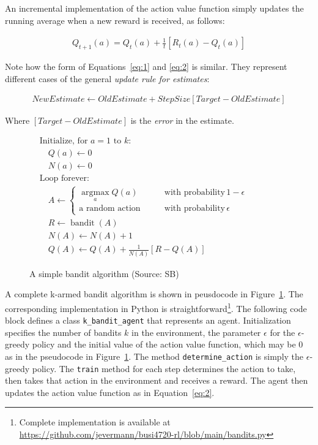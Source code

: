 An incremental implementation of the action value function simply updates the running average when a new reward is received, as follows:

\begin{align}
Q_{t+1}(a) = Q_t(a) + \frac{1}{t}\left[R_t(a) - Q_t(a)\right] \label{eq:2}
\end{align}

Note how the form of Equations~\ref{eq:1} and \ref{eq:2} is similar. They represent different cases of the general \emph{update rule for estimates}:

\begin{align*}
NewEstimate \leftarrow OldEstimate + StepSize \left[ Target - OldEstimate \right]
\end{align*}

Where $\left[ Target - OldEstimate \right]$ is the \emph{error} in the estimate.

\begin{figure}
\begin{tcolorbox}[colback=code]
\begin{align*}
&\text{Initialize, for $a=1$ to $k$:}\\
&\quad Q(a) \leftarrow 0 \\
&\quad N(a) \leftarrow 0 \\
&\text{Loop forever:} \\
&\quad A \leftarrow \begin{cases} \operatorname*{arg max}_a Q(a) &\qquad \text{with probability}\, 1-\epsilon \\
\text{a random action} &\qquad \text{with probability} 
\, \epsilon
\end{cases} \hspace{1in} \\
&\quad R \leftarrow \operatorname{bandit}(A) \\
&\quad N(A) \leftarrow N(A) + 1 \\
&\quad Q(A) \leftarrow Q(A) + \frac{1}{N(A)} \left[ R - Q(A) \right]
\end{align*}
\end{tcolorbox}
\caption{A simple bandit algorithm (Source: SB)}
\label{fig:karmedbandit}
\end{figure}

A complete k-armed bandit algorithm is shown in peusdocode in Figure~\ref{fig:karmedbandit}. The corresponding implementation in Python is straightforward\footnote{Complete implementation is available at \url{https://github.com/jevermann/busi4720-rl/blob/main/bandits.py}}. The following code block defines a class \texttt{k\_bandit\_agent} that represents an agent. Initialization specifies the number of bandits $k$ in the environment, the parameter $\epsilon$ for the $\epsilon$-greedy policy and the initial value of the action value function, which may be 0 as in the pseudocode in Figure~\ref{fig:karmedbandit}. The method \texttt{determine\_action} is simply the $\epsilon$-greedy policy. The \texttt{train} method for each step determines the action to take, then takes that action in the environment and receives a reward. The agent then updates the action value function as in Equation~\ref{eq:2}.

